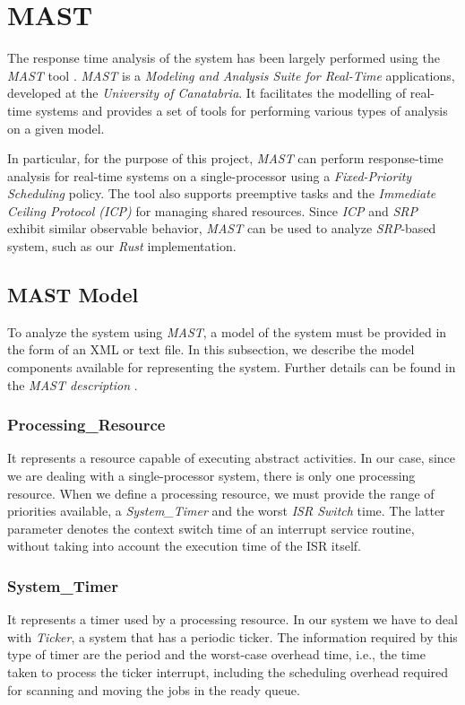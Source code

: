\section{MAST}
The response time analysis of the system has been largely performed using the
\textit{MAST} tool \cite{MASTComprehensiveTool}. \textit{MAST} is a
\textit{Modeling and Analysis Suite for Real-Time} applications, developed at
the \textit{University of Canatabria}. It facilitates the modelling of real-time
systems and provides a set of tools for performing various types of analysis on
a given model.

In particular, for the purpose of this project, \textit{MAST} can perform
response-time analysis for real-time systems on a single-processor using a
\textit{Fixed-Priority Scheduling} policy. The tool also supports preemptive 
tasks and the \textit{Immediate Ceiling Protocol (ICP)} for managing shared
resources. Since \textit{ICP} and \textit{SRP} exhibit similar observable
behavior, \textit{MAST} can be used to analyze \textit{SRP}-based system, such
as our \textit{Rust} implementation. 

\subsection{MAST Model}
To analyze the system using \textit{MAST}, a model of the system must be
provided in the form of an XML or text file. In this subsection, we describe
the model components available for representing the system. Further details can
be found in the \textit{MAST description} \cite{mastdescription}.

\subsubsection{Processing\_Resource} 
It represents a resource capable of executing abstract activities. In our case,
since we are dealing with a single-processor system, there is only one
processing resource. When we define a processing resource, we must provide the
range of priorities available, a \textit{System\_Timer} and the worst
\textit{ISR Switch} time. The latter parameter denotes the context switch time
of an interrupt service routine, without taking into account the execution time
of the ISR itself.

\subsubsection{System\_Timer} 
It represents a timer used by a processing resource. In our system we have to
deal with \textit{Ticker}, a system that has a periodic ticker. The
information required by this type of timer are the period and the worst-case
overhead time, i.e., the time taken to process the ticker interrupt, including
the scheduling overhead required for scanning and moving the jobs in the ready
queue. 

